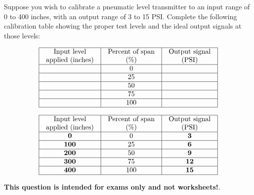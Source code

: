 

Suppose you wish to calibrate a pneumatic level transmitter to an input range of 0 to 400 inches, with an output range of 3 to 15 PSI.  Complete the following calibration table showing the proper test levels and the ideal output signals at those levels:


$$\vbox{\offinterlineskip
\halign{\strut
\vrule \quad\hfil # \ \hfil & 
\vrule \quad\hfil # \ \hfil & 
\vrule \quad\hfil # \ \hfil \vrule \cr
\noalign{\hrule}
%
Input level & Percent of span & Output signal \cr
%
applied (inches) & (\%) & (PSI) \cr
%
\noalign{\hrule}
%
 & 0 &  \cr
%
\noalign{\hrule}
%
 & 25 &  \cr
%
\noalign{\hrule}
%
 & 50 &  \cr
%
\noalign{\hrule}
%
 & 75 &  \cr
%
\noalign{\hrule}
%
 & 100 &  \cr
%
\noalign{\hrule}
} %
}$$ %








$$\vbox{\offinterlineskip
\halign{\strut
\vrule \quad\hfil # \ \hfil & 
\vrule \quad\hfil # \ \hfil & 
\vrule \quad\hfil # \ \hfil \vrule \cr
\noalign{\hrule}
%
Input level & Percent of span & Output signal \cr
%
applied (inches) & (\%) & (PSI) \cr
%
\noalign{\hrule}
%
{\bf 0} & 0 & {\bf 3} \cr
%
\noalign{\hrule}
%
{\bf 100} & 25 & {\bf 6} \cr
%
\noalign{\hrule}
%
{\bf 200} & 50 & {\bf 9} \cr
%
\noalign{\hrule}
%
{\bf 300} & 75 & {\bf 12} \cr
%
\noalign{\hrule}
%
{\bf 400} & 100 & {\bf 15} \cr
%
\noalign{\hrule}
} %
}$$ %







{\bf This question is intended for exams only and not worksheets!}.



